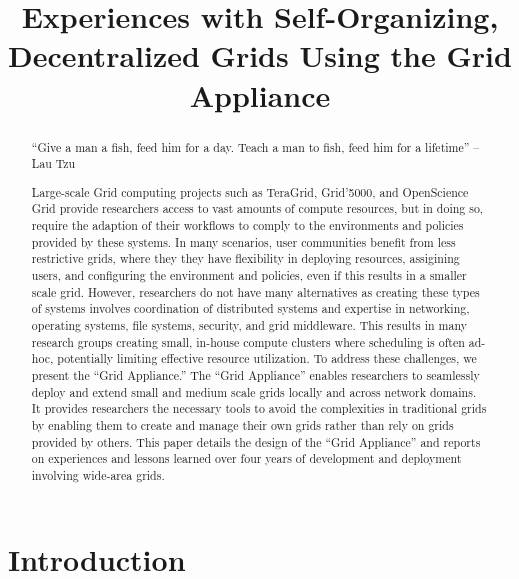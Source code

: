 \documentclass[conference]{IEEEtran}
\begin{document}
\title{Experiences with Self-Organizing, Decentralized Grids Using the Grid
Appliance}

\author{
}

\maketitle


\begin{abstract}

``Give a man a fish, feed him for a day.  Teach a man to fish, feed him for a
lifetime'' -- Lau Tzu

Large-scale Grid computing projects such as TeraGrid, Grid'5000, and
OpenScience Grid provide researchers access to vast amounts of compute
resources, but in doing so, require the adaption of their workflows to comply
to the environments and policies provided by these systems.  In many scenarios,
user communities benefit from less restrictive grids, where they they have
flexibility in deploying resources, assigining users, and configuring the
environment and policies, even if this results in a smaller scale grid.
However, researchers do not have many alternatives as creating these types of
systems involves coordination of distributed systems and expertise in
networking, operating systems, file systems, security, and grid middleware.
This results in many research groups creating small, in-house compute clusters
where scheduling is often ad-hoc, potentially limiting effective resource
utilization.  To address these challenges, we present the ``Grid Appliance.''
The ``Grid Appliance'' enables researchers to seamlessly deploy and extend
small and medium scale grids locally and across network domains.  It provides
researchers the necessary tools to avoid the complexities in traditional grids
by enabling them to create and manage their own grids rather than rely on grids
provided by others.  This paper details the design of the ``Grid Appliance''
and reports on experiences and lessons learned over four years of development
and deployment involving wide-area grids.

\end{abstract}

\section{Introduction}
\end{document}
